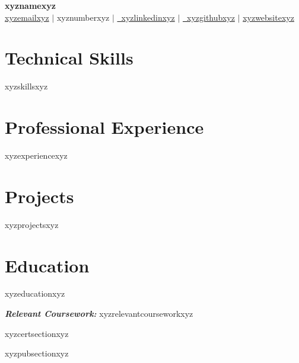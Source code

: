 \documentclass[letterpaper,10pt]{article}
\begin{document}
\begin{center}
    {\LARGE\bfseries xyznamexyz} \\[5pt]
    \href{mailto:xyzemailxyz}{xyzemailxyz} $\vert$ xyznumberxyz $\vert$
    \href{https://linkedin.com/in/xyzlinkedinxyz}{\faLinkedin\ xyzlinkedinxyz} $\vert$
    \href{https://github.com/xyzgithubxyz}{\faGithub\ xyzgithubxyz} $\vert$
    \href{https://xyzwebsitexyz}{xyzwebsitexyz}
\end{center}

\vspace{-6pt}

\section*{Technical Skills}
\begin{itemize}[leftmargin=1.5em, itemsep=0pt, topsep=1pt]
   xyzskillsxyz
\end{itemize}

\vspace{-4pt}

\section*{Professional Experience}
\vspace{2pt}
xyzexperiencexyz

\vspace{-6pt}
\section*{Projects}
\vspace{2pt}
xyzprojectsxyz

\vspace{-6pt}
\section*{Education}
\begin{itemize}[leftmargin=1.5em, itemsep=4pt, topsep=1pt]
    xyzeducationxyz
\end{itemize}
\vspace{2pt}
\textit{\textbf{Relevant Coursework:}} xyzrelevantcourseworkxyz

xyzcertsectionxyz

xyzpubsectionxyz
\end{document}
